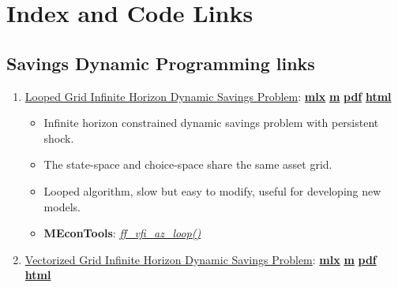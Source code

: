 \documentclass[
]{book}
\providecommand{\tightlist}{%
  \setlength{\itemsep}{0pt}\setlength{\parskip}{0pt}}
\begin{document}
\hypertarget{appendix-appendix}{%
\appendix}


\hypertarget{index-and-code-links}{%
\chapter{Index and Code Links}\label{index-and-code-links}}

\hypertarget{savings-dynamic-programming-links}{%
\section{Savings Dynamic Programming links}\label{savings-dynamic-programming-links}}

\begin{enumerate}
\def\labelenumi{\arabic{enumi}.}
\tightlist
\item
  \href{https://fanwangecon.github.io/MEconTools/MEconTools/doc/vfi/htmlpdfm/fx_vfi_az_loop.html}{Looped Grid Infinite Horizon Dynamic Savings Problem}: \href{https://github.com/FanWangEcon/MEconTools/blob/master/MEconTools/doc/vfi/fx_vfi_az_loop.mlx}{\textbf{mlx}} \textbar{} \href{https://github.com/FanWangEcon/MEconTools/blob/master/MEconTools/doc/vfi/htmlpdfm/fx_vfi_az_loop.m}{\textbf{m}} \textbar{} \href{https://github.com/FanWangEcon/MEconTools/blob/master/MEconTools/doc/vfi/htmlpdfm/fx_vfi_az_loop.pdf}{\textbf{pdf}} \textbar{} \href{https://fanwangecon.github.io/MEconTools/MEconTools/doc/vfi/htmlpdfm/fx_vfi_az_loop.html}{\textbf{html}}

  \begin{itemize}
  \tightlist
  \item
    Infinite horizon constrained dynamic savings problem with persistent shock.
  \item
    The state-space and choice-space share the same asset grid.
  \item
    Looped algorithm, slow but easy to modify, useful for developing new models.
  \item
    \textbf{MEconTools}: \emph{\href{https://github.com/FanWangEcon/MEconTools/blob/master/MEconTools/vfi/ff_vfi_az_loop.m}{ff\_vfi\_az\_loop()}}
  \end{itemize}
\item
  \href{https://fanwangecon.github.io/MEconTools/MEconTools/doc/vfi/htmlpdfm/fx_vfi_az_vec.html}{Vectorized Grid Infinite Horizon Dynamic Savings Problem}: \href{https://github.com/FanWangEcon/MEconTools/blob/master/MEconTools/doc/vfi/fx_vfi_az_vec.mlx}{\textbf{mlx}} \textbar{} \href{https://github.com/FanWangEcon/MEconTools/blob/master/MEconTools/doc/vfi/htmlpdfm/fx_vfi_az_vec.m}{\textbf{m}} \textbar{} \href{https://github.com/FanWangEcon/MEconTools/blob/master/MEconTools/doc/vfi/htmlpdfm/fx_vfi_az_vec.pdf}{\textbf{pdf}} \textbar{} \href{https://fanwangecon.github.io/MEconTools/MEconTools/doc/vfi/htmlpdfm/fx_vfi_az_vec.html}{\textbf{html}}


\end{enumerate}
\end{document}
